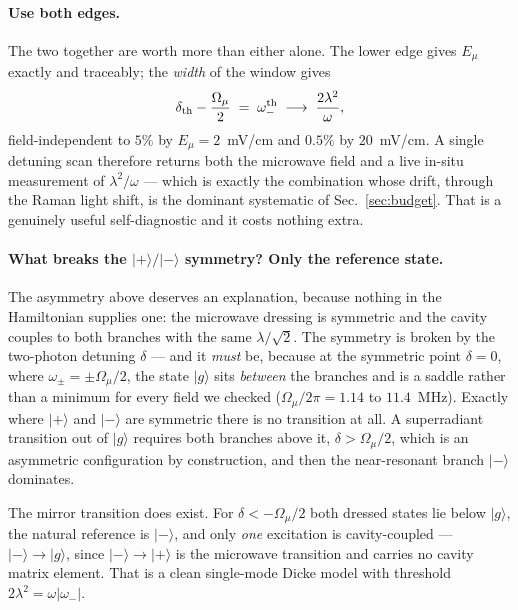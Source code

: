 \documentclass[11pt,a4paper]{article}
\newcommand{\Omu}{\Omega_{\mu}}
\newcommand{\ket}[1]{\lvert #1 \rangle}
\begin{document}
\paragraph{Use both edges.} The two together are worth more than either alone. The lower edge
gives $E_\mu$ exactly and traceably; the \emph{width} of the window gives
\begin{equation}
  \delta_{\rm th}-\frac{\Omu}{2} \;=\; \omega_-^{\rm th} \;\longrightarrow\; \frac{2\lambda^2}{\omega},
\end{equation}
field-independent to $5\%$ by $E_\mu=2$~mV/cm and $0.5\%$ by $20$~mV/cm. A single detuning
scan therefore returns both the microwave field and a live in-situ measurement of
$\lambda^2/\omega$ --- which is exactly the combination whose drift, through the Raman light
shift, is the dominant systematic of Sec.~\ref{sec:budget}. That is a genuinely useful
self-diagnostic and it costs nothing extra.

\paragraph{What breaks the $\ket{+}/\ket{-}$ symmetry? Only the reference state.} The
asymmetry above deserves an explanation, because nothing in the Hamiltonian supplies one: the
microwave dressing is symmetric and the cavity couples to both branches with the same
$\lambda/\sqrt2$. The symmetry is broken by the two-photon detuning $\delta$ --- and it
\emph{must} be, because at the symmetric point $\delta=0$, where $\omega_\pm=\pm\Omu/2$,
the state $\ket{g}$ sits \emph{between} the branches and is a saddle rather than a minimum for
every field we checked ($\Omu/2\pi=1.14$ to $11.4$~MHz). Exactly where $\ket{+}$ and $\ket{-}$
are symmetric there is no transition at all. A superradiant transition out of $\ket{g}$
requires both branches above it, $\delta>\Omu/2$, which is an asymmetric configuration by
construction, and then the near-resonant branch $\ket{-}$ dominates.

The mirror transition does exist. For $\delta<-\Omu/2$ both dressed states lie below
$\ket{g}$, the natural reference is $\ket{-}$, and only \emph{one} excitation is
cavity-coupled --- $\ket{-}\!\to\!\ket{g}$, since $\ket{-}\!\to\!\ket{+}$ is the microwave
transition and carries no cavity matrix element. That is a clean single-mode Dicke model with
threshold $2\lambda^2=\omega|\omega_-|$.
\end{document}
